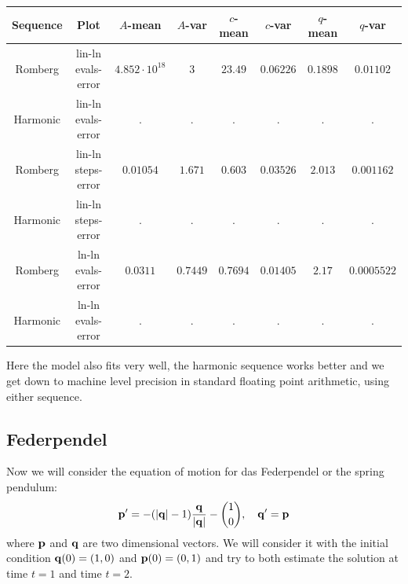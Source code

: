 \begin{table}[H]
    \centering
    \small
     \begin{tabular}{c|c||c|c|c|c|c|c}
Sequence & Plot & \(A\)-mean & \(A\)-var & \(c\)-mean & \(c\)-var & \(q\)-mean & \(q\)-var\\\hline
Romberg & lin-ln evals-error & \(4.852\cdot 10^{18}\) & \(3\) & \(23.49\) & \(0.06226\) & \(0.1898\) & \(0.01102\) \\
Harmonic & lin-ln evals-error & . & . & . & . & . & . \\
Romberg & lin-ln steps-error & \(0.01054\) & \(1.671\) & \(0.603\) & \(0.03526\) & \(2.013\) & \(0.001162\) \\
Harmonic & lin-ln steps-error & . & . & . & . & . & . \\
Romberg & ln-ln evals-error & \(0.0311\) & \(0.7449\) & \(0.7694\) & \(0.01405\) & \(2.17\) & \(0.0005522\) \\
Harmonic & ln-ln evals-error & . & . & . & . & . & . \\
    \end{tabular}
    \label{tab:my_label}
\end{table}

Here the model also fits very well, the harmonic sequence works better and we get down to machine level precision in standard floating point arithmetic, using either sequence.

\subsection{Federpendel}

Now we will consider the equation of motion for das Federpendel or the spring pendulum:
\[
\mathbf{p}' = -(|\mathbf{q}| - 1)\frac{\mathbf{q}}{|\mathbf{q}|} - {1\choose 0}, \quad \mathbf{q}' = \mathbf{p}
\]
where \(\mathbf{p}\) and \(\mathbf{q}\) are two dimensional vectors. We will consider it with the initial condition \(\mathbf{q}(0) = (1,0)\) and \(\mathbf{p}(0) = (0,1)\) and try to both estimate the solution at time \(t = 1\) and time \(t = 2\).

